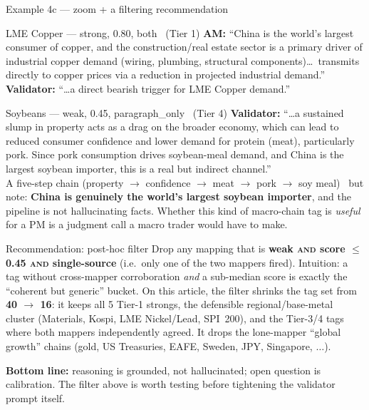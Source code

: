 \documentclass[10pt,aspectratio=169]{beamer}
\begin{document}
\begin{frame}{Example 4c --- zoom + a filtering recommendation}
  \scriptsize
  \begin{block}{LME Copper --- strong, 0.80, both \ (\textcolor{goodgreen}{Tier 1})}
    \scriptsize
    \textbf{AM:} ``China is the world's largest consumer of copper, and the construction/real
    estate sector is a primary driver of industrial copper demand (wiring, plumbing, structural
    components)\ldots\ transmits directly to copper prices via a reduction in projected
    industrial demand.'' \quad \textbf{Validator:} ``\ldots a direct bearish trigger for LME
    Copper demand.''
  \end{block}

  \begin{block}{Soybeans --- weak, 0.45, paragraph\_only \ (Tier 4)}
    \scriptsize
    \textbf{Validator:} ``\ldots a sustained slump in property acts as a drag on the broader
    economy, which can lead to reduced consumer confidence and lower demand for protein
    (meat), particularly pork. Since pork consumption drives soybean-meal demand, and China is
    the largest soybean importer, this is a real but indirect channel.'' \\[0.15em]
    A five-step chain (property $\rightarrow$ confidence $\rightarrow$ meat $\rightarrow$ pork
    $\rightarrow$ soy meal) \textemdash\ but note: \textbf{China is genuinely the world's largest
    soybean importer}, and the pipeline is not hallucinating facts. Whether this kind of
    macro-chain tag is \emph{useful} for a PM is a judgment call a macro trader would have to
    make.
  \end{block}

  \begin{alertblock}{Recommendation: post-hoc filter}
    \scriptsize
    Drop any mapping that is \textbf{weak \textsc{and} score $\leq$ 0.45 \textsc{and} single-source}
    (i.e.\ only one of the two mappers fired). Intuition: a tag without cross-mapper
    corroboration \emph{and} a sub-median score is exactly the ``coherent but generic'' bucket.
    On this article, the filter shrinks the tag set from \textbf{40 $\rightarrow$ 16}: it keeps
    all 5 Tier-1 strongs, the defensible regional/base-metal cluster (Materials, Kospi, LME
    Nickel/Lead, SPI~200), and the Tier-3/4 tags where both mappers independently agreed. It
    drops the lone-mapper ``global growth'' chains (gold, US Treasuries, EAFE, Sweden, JPY,
    Singapore, $\ldots$).
  \end{alertblock}

  \textcolor{goodgreen}{\textbf{Bottom line:}} reasoning is grounded, not hallucinated; open
  question is calibration. The filter above is worth testing before tightening the validator
  prompt itself.
\end{frame}
\end{document}
